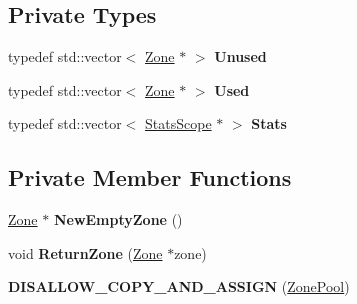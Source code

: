 \subsection*{Private Types}
\begin{DoxyCompactItemize}
\item 
typedef std\+::vector$<$ \hyperlink{classv8_1_1internal_1_1_zone}{Zone} $\ast$ $>$ {\bfseries Unused}\hypertarget{classv8_1_1internal_1_1compiler_1_1_zone_pool_a232b9f772e8d13b0297b940640d5366b}{}\label{classv8_1_1internal_1_1compiler_1_1_zone_pool_a232b9f772e8d13b0297b940640d5366b}

\item 
typedef std\+::vector$<$ \hyperlink{classv8_1_1internal_1_1_zone}{Zone} $\ast$ $>$ {\bfseries Used}\hypertarget{classv8_1_1internal_1_1compiler_1_1_zone_pool_ad864a370c54255ec7de949d05fcd5e9e}{}\label{classv8_1_1internal_1_1compiler_1_1_zone_pool_ad864a370c54255ec7de949d05fcd5e9e}

\item 
typedef std\+::vector$<$ \hyperlink{classv8_1_1internal_1_1compiler_1_1_zone_pool_1_1_stats_scope}{Stats\+Scope} $\ast$ $>$ {\bfseries Stats}\hypertarget{classv8_1_1internal_1_1compiler_1_1_zone_pool_a18a59335d15bb3d9c466571fb8c3dd8f}{}\label{classv8_1_1internal_1_1compiler_1_1_zone_pool_a18a59335d15bb3d9c466571fb8c3dd8f}

\end{DoxyCompactItemize}
\subsection*{Private Member Functions}
\begin{DoxyCompactItemize}
\item 
\hyperlink{classv8_1_1internal_1_1_zone}{Zone} $\ast$ {\bfseries New\+Empty\+Zone} ()\hypertarget{classv8_1_1internal_1_1compiler_1_1_zone_pool_a940d0338ebf4980cd847a5f28c0c32e3}{}\label{classv8_1_1internal_1_1compiler_1_1_zone_pool_a940d0338ebf4980cd847a5f28c0c32e3}

\item 
void {\bfseries Return\+Zone} (\hyperlink{classv8_1_1internal_1_1_zone}{Zone} $\ast$zone)\hypertarget{classv8_1_1internal_1_1compiler_1_1_zone_pool_af43a72a9a131778996a33a8cc00284fb}{}\label{classv8_1_1internal_1_1compiler_1_1_zone_pool_af43a72a9a131778996a33a8cc00284fb}

\item 
{\bfseries D\+I\+S\+A\+L\+L\+O\+W\+\_\+\+C\+O\+P\+Y\+\_\+\+A\+N\+D\+\_\+\+A\+S\+S\+I\+GN} (\hyperlink{classv8_1_1internal_1_1compiler_1_1_zone_pool}{Zone\+Pool})\hypertarget{classv8_1_1internal_1_1compiler_1_1_zone_pool_ad6199baf79d6ba2fc57a93ac82df3ed7}{}\label{classv8_1_1internal_1_1compiler_1_1_zone_pool_ad6199baf79d6ba2fc57a93ac82df3ed7}

\end{DoxyCompactItemize}
